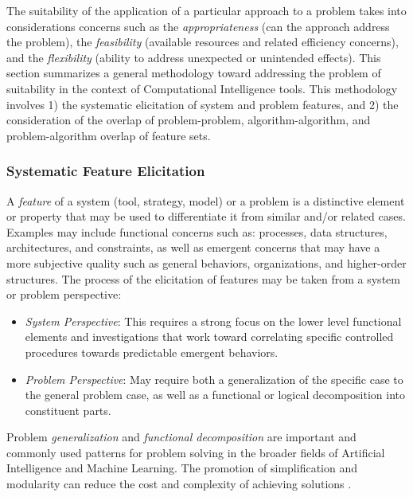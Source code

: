 The suitability of the application of a particular approach to a problem takes into considerations concerns such as the \emph{appropriateness} (can the approach address the problem), the \emph{feasibility} (available resources and related efficiency concerns), and the \emph{flexibility} (ability to address unexpected or unintended effects).
This section summarizes a general methodology toward addressing the problem of suitability in the context of Computational Intelligence tools. This methodology involves 1) the systematic elicitation of system and problem features, and 2) the consideration of the overlap of problem-problem, algorithm-algorithm, and problem-algorithm overlap of feature sets. 

\subsubsection{Systematic Feature Elicitation}
A \emph{feature} of a system (tool, strategy, model) or a problem is a distinctive element or property that may be used to differentiate it from similar and/or related cases. Examples may include functional concerns such as: processes, data structures, architectures, and constraints, as well as emergent concerns that may have a more subjective quality such as general behaviors, organizations, and higher-order structures. The process of the elicitation of features may be taken from a system or problem perspective:

\begin{itemize}
	\item \emph{System Perspective}: This requires a strong focus on the lower level functional elements and investigations that work toward correlating specific controlled procedures towards predictable emergent behaviors. 
	\item \emph{Problem Perspective}: May require both a generalization of the specific case to the general problem case, as well as a functional or logical decomposition into constituent parts.
\end{itemize}

Problem \emph{generalization} and \emph{functional decomposition} are important and commonly used patterns for problem solving in the broader fields of Artificial Intelligence and Machine Learning. The promotion of simplification and modularity can reduce the cost and complexity of achieving solutions \cite{Russell2009, Brooks1986}.

%
%
